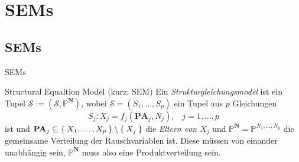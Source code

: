 \section{SEMs}
\subsection{SEMs}
\begin{frame}{SEMs}
    \begin{block}{Structural Equaltion Model (kurz: SEM)}
        Ein \textit{Strukturgleichungsmodel} ist ein Tupel
        $\mathcal{S} := (\mathcal{S}, \mathbb{P}^\mathbf{N})$, wobei
        $\mathcal{S} = (S_1, \dots, S_p)$ ein Tupel aus $p$ Gleichungen
        \[S_j : X_j = f_j(\mathbf{PA}_j, N_j), \;\;\; j=1, \dots, p\]
        ist und $\mathbf{PA}_j \subseteq \Set{X_1, \dots, X_p} \setminus \Set{X_j}$
        die \textit{Eltern von $X_j$} und $\mathbb{P}^\mathbf{N} = \mathbb{P}^{N_1, \dots, N_p}$
        die gemeinsame Verteilung der Rauschvariablen ist. Diese müssen
        von einander unabhängig sein, $\mathbb{P}^\mathbf{N}$ muss also eine
        Produktverteilung sein.
    \end{block}
\end{frame}
